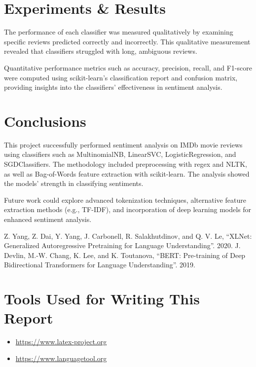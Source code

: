 \documentclass{article}
\begin{document}
\newpage

\section{Experiments \& Results}

The performance of each classifier was measured qualitatively by examining specific reviews predicted correctly and incorrectly. This qualitative measurement revealed that classifiers struggled with long, ambiguous reviews.

Quantitative performance metrics such as accuracy, precision, recall, and F1-score were computed using scikit-learn's classification report and confusion matrix, providing insights into the classifiers' effectiveness in sentiment analysis.

\newpage

\section{Conclusions}

This project successfully performed sentiment analysis on IMDb movie reviews using classifiers such as MultinomialNB, LinearSVC, LogisticRegression, and SGDClassifiers. The methodology included preprocessing with regex and NLTK, as well as Bag-of-Words feature extraction with scikit-learn. The analysis showed the models' strength in classifying sentiments. 

Future work could explore advanced tokenization techniques, alternative feature extraction methods (e.g., TF-IDF), and incorporation of deep learning models for enhanced sentiment analysis.

\begin{thebibliography}{9}
 Z. Yang, Z. Dai, Y. Yang, J. Carbonell, R. Salakhutdinov, and Q. V. Le, “XLNet: Generalized Autoregressive Pretraining for Language Understanding”. 2020.
 J. Devlin, M.-W. Chang, K. Lee, and K. Toutanova, “BERT: Pre-training of Deep Bidirectional Transformers for Language Understanding”. 2019.
\end{thebibliography}

\newpage
\section*{Tools Used for Writing This Report}
\begin{itemize}
    \item \url{https://www.latex-project.org}
    \item \url{https://www.languagetool.org}
\end{itemize}
\end{document}
